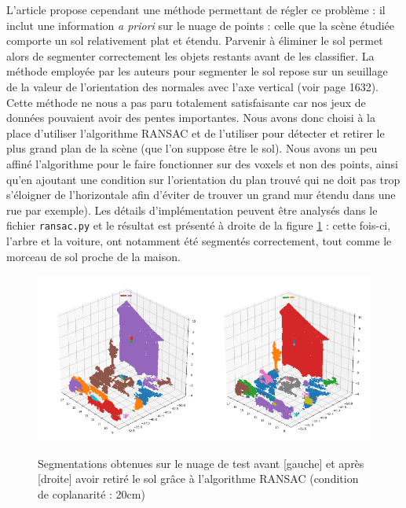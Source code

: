 \documentclass[a4paper, onecolumn, 11pt]{article}
\begin{document}
L'article propose cependant une méthode permettant de régler ce problème : il inclut une information \emph{a priori} sur le nuage de points : celle que la scène étudiée comporte un sol relativement plat et étendu. Parvenir à éliminer le sol permet alors de segmenter correctement les objets restants avant de les classifier.
La méthode employée par les auteurs pour segmenter le sol repose sur un seuillage de la valeur de l'orientation des normales avec l'axe vertical (voir page 1632). Cette méthode ne nous a pas paru totalement satisfaisante car nos jeux de données pouvaient avoir des pentes importantes. Nous avons donc choisi à la place d'utiliser l'algorithme RANSAC \cite{ransac} et de l'utiliser pour détecter et retirer le plus grand plan de la scène (que l'on suppose être le sol). Nous avons un peu affiné l'algorithme pour le faire fonctionner sur des voxels et non des points, ainsi qu'en ajoutant une condition sur l'orientation du plan trouvé qui ne doit pas trop s'éloigner de l'horizontale afin d'éviter de trouver un grand mur étendu dans une rue par exemple). Les détails d'implémentation peuvent être analysés dans le fichier \texttt{ransac.py} et le résultat est présenté à droite de la figure \ref{fig:first_segmentations} : cette fois-ci, l'arbre et la voiture, ont notamment été segmentés correctement, tout comme le morceau de sol proche de la maison.

\begin{figure}[h]
    \centering
    \includegraphics[width=0.5\textwidth]{fig/first_segmentation.png}\includegraphics[width=0.5\textwidth]{fig/second_segmentation.png}
    \caption{Segmentations obtenues sur le nuage de test avant [gauche] et après [droite] avoir retiré le sol grâce à l'algorithme RANSAC (condition de coplanarité : 20cm)}
    \label{fig:first_segmentations}
\end{figure}
\end{document}
